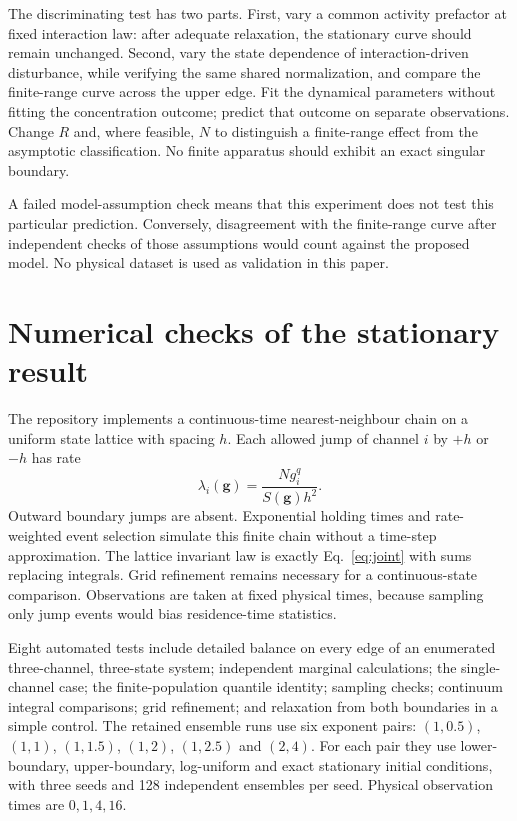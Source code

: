 \documentclass[11pt,a4paper]{article}
\begin{document}
The discriminating test has two parts. First, vary a common activity prefactor
at fixed interaction law: after adequate relaxation, the stationary curve should
remain unchanged. Second, vary the state dependence of interaction-driven disturbance,
while verifying the same shared normalization, and compare the finite-range
curve across the upper edge. Fit the dynamical parameters without fitting the
concentration outcome; predict that outcome on separate observations. Change $R$
and, where feasible, $N$ to distinguish a finite-range effect from the asymptotic
classification. No finite apparatus should exhibit an exact singular boundary.

A failed model-assumption check means that this experiment does not test this
particular prediction. Conversely, disagreement with the finite-range curve after
independent checks of those assumptions would count against the proposed model.
No physical dataset is used as validation in this paper.

\section{Numerical checks of the stationary result}

The repository implements a continuous-time nearest-neighbour chain on a uniform
state lattice with spacing $h$. Each allowed jump of channel $i$ by $+h$ or $-h$
has rate
\begin{equation}
 \lambda_i(\mathbf g)=\frac{N g_i^q}{S(\mathbf g)h^2}.
\end{equation}
Outward boundary jumps are absent. Exponential holding times and rate-weighted
event selection simulate this finite chain without a time-step approximation.
The lattice invariant law is exactly Eq.~\eqref{eq:joint} with sums replacing
integrals. Grid refinement remains necessary for a continuous-state comparison.
Observations are taken at fixed physical times, because sampling only jump
events would bias residence-time statistics.

Eight automated tests include detailed balance on every edge of an enumerated
three-channel, three-state system; independent marginal calculations; the
single-channel case; the finite-population quantile identity; sampling checks;
continuum integral comparisons; grid refinement; and relaxation from both
boundaries in a simple control. The retained ensemble runs use six exponent pairs:
$(1,0.5)$, $(1,1)$, $(1,1.5)$, $(1,2)$, $(1,2.5)$ and $(2,4)$.
For each pair they use lower-boundary, upper-boundary, log-uniform and exact
stationary initial conditions, with three seeds and 128 independent ensembles
per seed. Physical observation times are $0,1,4,16$.
\end{document}
